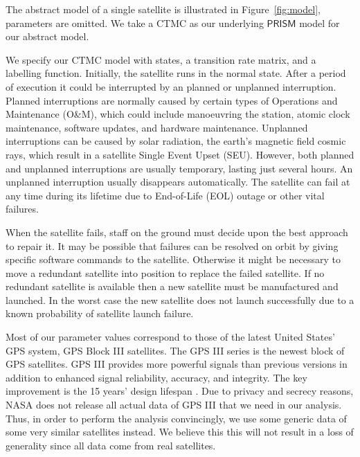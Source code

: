 \documentclass[preprint,12pt]{qrei}
\begin{document}
The abstract model of a single satellite is illustrated in Figure~\ref{fig:model}, parameters are omitted. We take a CTMC as our underlying $\mathsf{PRISM}$ model for our abstract model.

We specify our CTMC model with states, a transition rate matrix, and a labelling function. Initially, the satellite runs in the normal state. After a period of execution it could be interrupted by an planned or unplanned interruption. Planned interruptions are normally caused by certain types of Operations and Maintenance (O\&M), which could include manoeuvring the station, atomic clock maintenance, software updates, and hardware maintenance. Unplanned interruptions can be caused by solar radiation, the earth's magnetic field cosmic rays, which result in a satellite Single Event Upset (SEU). However, both planned and unplanned interruptions are usually temporary, lasting just several hours. An unplanned interruption usually disappears automatically. The satellite can fail at any time during its lifetime due to End-of-Life (EOL) outage or other vital failures.

When the satellite fails, staff on the ground must decide upon the best approach to repair it. It may be possible that failures can be resolved on orbit by giving specific software commands to the satellite. Otherwise it might be necessary to move a redundant satellite into position to replace the failed satellite. If no redundant satellite is available then a new satellite must be manufactured and launched. In the worst case the new satellite does not launch successfully due to a known probability of satellite launch failure.

Most of our parameter values correspond to those of the latest United States' GPS system, GPS Block III satellites. The GPS III series is the newest block of GPS satellites. GPS III provides more powerful signals than previous versions in addition to enhanced signal reliability, accuracy, and integrity. The key improvement is the 15 years' design lifespan \cite{NOA13}. Due to privacy and secrecy reasons, NASA does not release all actual data of GPS III that we need in our analysis. Thus, in order to perform the analysis convincingly, we use some generic data of some very similar satellites instead. We believe this this will not result in a loss of generality since all data come from real satellites.
\end{document}
